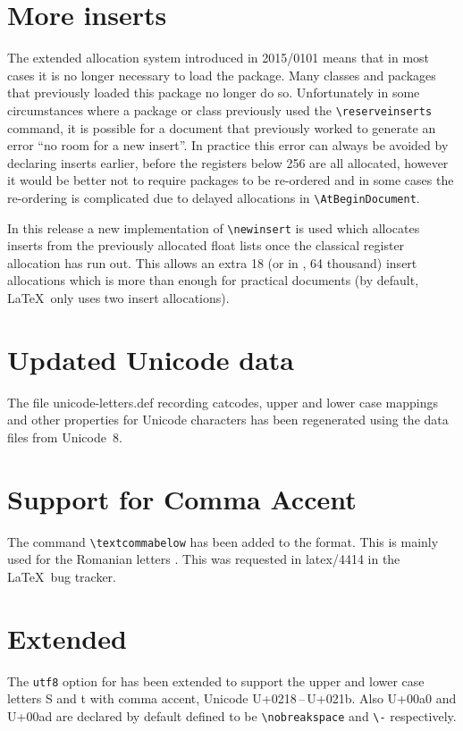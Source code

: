 \documentclass{ltnews}
\begin{document}
\section{More inserts}
The extended allocation system introduced in 2015/0101 means that in
most cases it is no longer necessary to load the 
package. Many classes and packages that previously loaded this package
no longer do so. Unfortunately in some circumstances where a package
or class previously used the  \verb|\reserveinserts|
command, it is possible for a document that previously worked to
generate an error ``no room for a new insert''. In practice this error
can always be avoided by declaring inserts earlier, before the
registers below 256 are all allocated, however it would be better not
to require packages to be re-ordered and in some cases the re-ordering
is complicated due to delayed allocations in \verb|\AtBeginDocument|.

In this release a new implementation of
\verb|\newinsert| is used which allocates inserts from the previously
allocated float lists once the classical register allocation has run
out. This allows an extra 18 (or in , 64 thousand)
insert allocations which is more than enough for practical documents
(by default, \LaTeX\ only uses two insert allocations).

\section{Updated Unicode data}


The file \textsf{unicode-letters.def} recording catcodes, upper and
lower case mappings and other properties for Unicode characters has
been regenerated using the data files from Unicode~8.

\section{Support for Comma Accent}
The command \verb|\textcommabelow| has been added to the format.
This is mainly used for the Romanian letters 
.
This was requested in latex/4414 in the \LaTeX\ bug tracker.

\section{Extended }
The \texttt{utf8} option for  has been extended to support
the upper and lower case letters S and t with comma accent, Unicode
U+0218\,--\,U+021b.
Also U+00a0 and U+00ad are declared by default defined to be
\verb|\nobreakspace| and \verb|\-| respectively.
\end{document}
